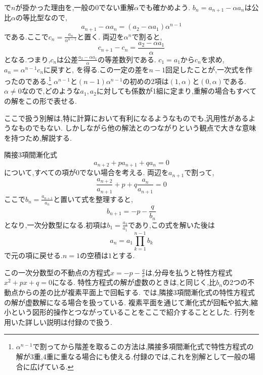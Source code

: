 で$n$が掛かった理由を,一般の0でない重解$\alpha$でも確かめよう.
$b_n=a_{n+1}-\alpha a_n$は公比$\alpha$の等比型なので,
\[
  a_{n+1}-\alpha a_n=(a_2-\alpha a_1)\alpha^{n-1}
\]
である.ここで$c_n=\frac{a_n}{\alpha^{n-1}}$と置く.
両辺を$\alpha^n$で割ると,
\[
  c_{n+1}-c_n=\frac{a_2-\alpha a_1}{\alpha}
\]
となる.つまり,$c_n$は公差$\frac{a_2-\alpha a_1}{\alpha}$の等差数列である.
$c_1=a_1$から$c_n$を求め,$a_n=\alpha^{n-1}c_n$に戻すと,
\BookMathLayout{\[
    a_n=\left\{a_1+(n-1)\left(\frac{a_2}{\alpha}-a_1\right)\right\}\alpha^{n-1}
  \]}{\[
    \begin{aligned}
      a_n&=\left\{a_1+(n-1)\left(\frac{a_2}{\alpha}-a_1\right)\right\}\\
      &\qquad\cdot\alpha^{n-1}
    \end{aligned}
  \]}
を得る.この一定の差を$n-1$回足したことが,一次式を作ったのである.\footnote{$\alpha^{n-1}$で割ってから階差を取るこの方法は,隣接多項間漸化式で特性方程式の解が3重,4重に重なる場合にも使える.付録のでは,これを別解として一般の場合に広げている.}
$\alpha^{n-1}$と$(n-1)\alpha^{n-1}$の初めの2項は$(1,\alpha)$と$(0,\alpha)$である.
$\alpha\ne0$なので,どのような$a_1,a_2$に対しても係数が1組に定まり,重解の場合もすべての解をこの形で表せる.


ここで扱う別解は,特に計算において有利になるようなものでも,汎用性があるようなものでもない.
しかしながら他の解法とのつながりという観点で大きな意味を持つため,解説する.

隣接3項間漸化式
\[
  a_{n+2}+pa_{n+1}+qa_n=0
\]
について,すべての項が0でない場合を考える.
両辺を$a_{n+1}$で割って,
\[
  \frac{a_{n+2}}{a_{n+1}}+p+q\frac{a_n}{a_{n+1}}=0
\]
ここで$b_n=\frac{a_{n+1}}{a_n}$と置いて式を整理すると,
\[
  b_{n+1}=-p-\frac{q}{b_n}
\]
となり,一次分数型になる.初項は$b_1=\frac{a_2}{a_1}$であり,この式を解いた後は
\[
  a_n=a_1\prod_{k=1}^{n-1}b_k
\]
で元の項に戻せる.$n=1$の空積は$1$とする.

この一次分数型の不動点の方程式$x=-p-\frac{q}{x}$は,分母を払うと特性方程式$x^2+px+q=0$になる.
特性方程式の解が虚数のときは,と同じく,比$b_n$の2つの不動点からの差の比が複素平面上で回転する.
では,隣接3項間漸化式の特性方程式の解が虚数解になる場合を扱っている.
複素平面を通じて漸化式が回転や拡大,縮小という図形的操作とつながっていることをここで紹介することとした.
行列を用いた詳しい説明は付録ので扱う.

